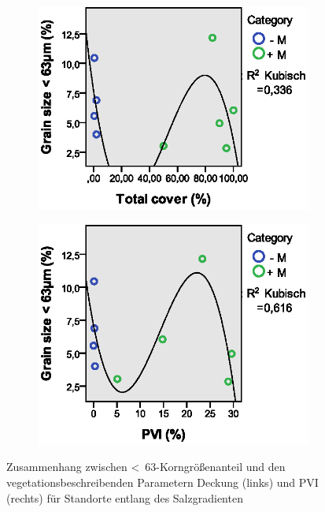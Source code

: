 \begin{figure}[!htb]
        \centering
        \begin{subfigure}[htb]{0.45\textwidth}
                \includegraphics[width=\textwidth]{images/salzsedimentauswertung/63_vs_cover.eps}
        \end{subfigure}
        \begin{subfigure}[htb]{0.45\textwidth}
                \includegraphics[width=\textwidth]{images/salzsedimentauswertung/63_vs_pvi.eps}
        \end{subfigure}
        \caption[Regressionsmodell: Vegetation und \unit{<63}{\mu\metre}-Korngrößenanteil für Stationen des 											Salzgradienten]{Zusammenhang zwischen \unit{<63}{\mu\metre}-Korngrößenanteil 									und den vegetationsbeschreibenden Parametern Deckung (links) und PVI 												(rechts) für Standorte entlang des Salzgradienten}
        \label{fig: Regression_Vegetation_63}
\end{figure}

